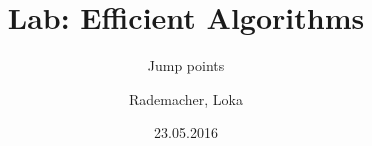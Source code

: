 \title[slide $\text{\insertframenumber}$]{Lab: Efficient Algorithms}
\subtitle{Jump points}
\author{Rademacher, Loka}
\date{23.05.2016}
